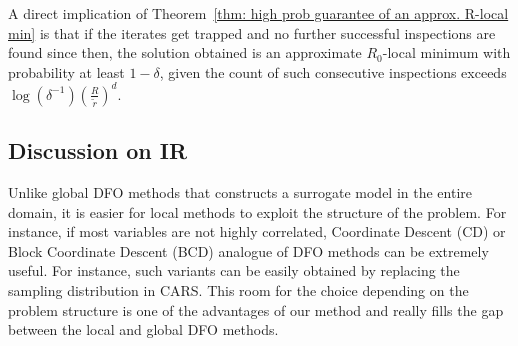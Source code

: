 A direct implication of Theorem~\ref{thm: high prob guarantee of an approx. R-local min} is that if the iterates get trapped and no further successful inspections are found since then, the solution obtained is an approximate $R_0$-local minimum with probability at least $1-\delta$, given the count of such consecutive inspections exceeds  $\log(\delta^{-1}) \left(\frac{R}{\tilde{r}}\right)^d$.

\subsection{Discussion on IR}
Unlike global DFO methods that constructs a surrogate model in the entire domain, it is easier for local methods to exploit the structure of the problem.
For instance, if most variables are not highly correlated, Coordinate Descent (CD) \cite{wright2015coordinate} or Block Coordinate Descent (BCD) \cite{tseng2001convergence} analogue of DFO methods can be extremely useful. For instance, such variants can be easily obtained by replacing the sampling distribution in CARS.
This room for the choice depending on the problem structure is one of the advantages of our method and really fills the gap between the local and global DFO methods.